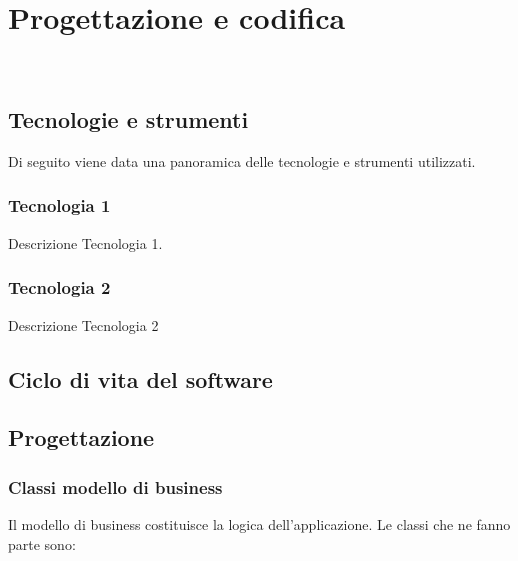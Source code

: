 \chapter{Progettazione e codifica}
\label{cap:progettazione-codifica}

\\

\section{Tecnologie e strumenti}
\label{sec:tecnologie-strumenti}

Di seguito viene data una panoramica delle tecnologie e strumenti utilizzati.

\subsection*{Tecnologia 1}
Descrizione Tecnologia 1.

\subsection*{Tecnologia 2}
Descrizione Tecnologia 2

\section{Ciclo di vita del software}
\label{sec:ciclo-vita-software}

\section{Progettazione}
\label{sec:progettazione}

\subsection{Classi modello di business} %
Il modello di business costituisce la logica dell'applicazione.
Le classi che ne fanno parte sono:

